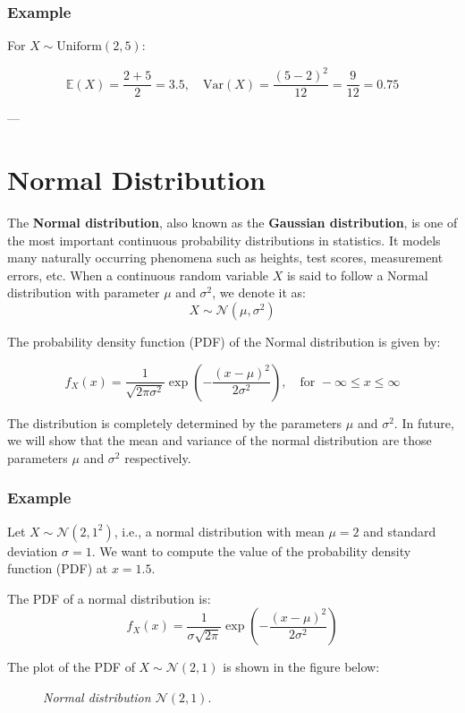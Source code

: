 \documentclass[twoside]{book}
\begin{document}
\subsubsection{Example}
For $X \sim \text{Uniform}(2, 5)$:

\[
\mathbb{E}(X) = \frac{2 + 5}{2} = 3.5, \quad \text{Var}(X) = \frac{(5 - 2)^2}{12} = \frac{9}{12} = 0.75
\]

---

\section{Normal Distribution}

The \textbf{Normal distribution}, also known as the \textbf{Gaussian distribution}, is one of the most important continuous probability distributions in statistics. It models many naturally occurring phenomena such as heights, test scores, measurement errors, etc. When a continuous random variable $X$ is said to follow a {Normal distribution} with parameter $\mu$ and $\sigma^2$, we denote it as:
\[
X \sim \mathcal{N}(\mu, \sigma^2)
\]

The probability density function (PDF) of the Normal distribution is given by:
\begin{textbox}
\[
f_X(x) = \frac{1}{\sqrt{2\pi\sigma^2}} \exp\left( -\frac{(x - \mu)^2}{2\sigma^2} \right), \quad \text{for } -\infty \leq x \leq \infty
\]
\end{textbox}

The distribution is completely determined by the parameters $\mu$ and $\sigma^2$. In future, we will show that the mean and variance of the normal distribution are those parameters $\mu$ and $\sigma^2$ respectively.

\subsubsection{Example}
Let $X \sim \mathcal{N}(2, 1^2)$, i.e., a normal distribution with mean $\mu = 2$ and standard deviation $\sigma = 1$.
We want to compute the value of the probability density function (PDF) at $x = 1.5$.

The PDF of a normal distribution is:
\[
f_X(x) = \frac{1}{\sigma\sqrt{2\pi }} \exp\left( -\frac{(x - \mu)^2}{2\sigma^2} \right)
\]

The plot of the PDF of $X \sim \mathcal{N}(2,1)$ is shown in the figure below:

\begin{figure}[H]
\begin{center}
\caption{\textit{Normal distribution $\mathcal{N}(2,1)$}.}
\end{center}
\end{figure}
\end{document}
